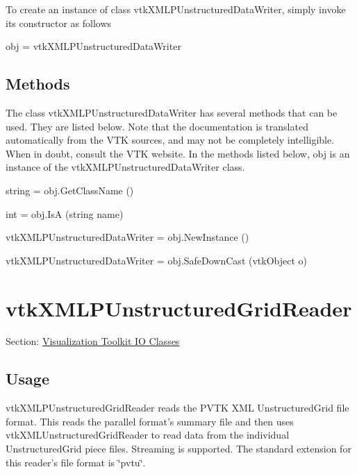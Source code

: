 To create an instance of class vtk\-X\-M\-L\-P\-Unstructured\-Data\-Writer, simply invoke its constructor as follows \begin{DoxyVerb}  obj = vtkXMLPUnstructuredDataWriter
\end{DoxyVerb}
 \hypertarget{vtkwidgets_vtkxyplotwidget_Methods}{}\subsection{Methods}\label{vtkwidgets_vtkxyplotwidget_Methods}
The class vtk\-X\-M\-L\-P\-Unstructured\-Data\-Writer has several methods that can be used. They are listed below. Note that the documentation is translated automatically from the V\-T\-K sources, and may not be completely intelligible. When in doubt, consult the V\-T\-K website. In the methods listed below, {\ttfamily obj} is an instance of the vtk\-X\-M\-L\-P\-Unstructured\-Data\-Writer class. 
\begin{DoxyItemize}
\item {\ttfamily string = obj.\-Get\-Class\-Name ()}  
\item {\ttfamily int = obj.\-Is\-A (string name)}  
\item {\ttfamily vtk\-X\-M\-L\-P\-Unstructured\-Data\-Writer = obj.\-New\-Instance ()}  
\item {\ttfamily vtk\-X\-M\-L\-P\-Unstructured\-Data\-Writer = obj.\-Safe\-Down\-Cast (vtk\-Object o)}  
\end{DoxyItemize}\hypertarget{vtkio_vtkxmlpunstructuredgridreader}{}\section{vtk\-X\-M\-L\-P\-Unstructured\-Grid\-Reader}\label{vtkio_vtkxmlpunstructuredgridreader}
Section\-: \hyperlink{sec_vtkio}{Visualization Toolkit I\-O Classes} \hypertarget{vtkwidgets_vtkxyplotwidget_Usage}{}\subsection{Usage}\label{vtkwidgets_vtkxyplotwidget_Usage}
vtk\-X\-M\-L\-P\-Unstructured\-Grid\-Reader reads the P\-V\-T\-K X\-M\-L Unstructured\-Grid file format. This reads the parallel format's summary file and then uses vtk\-X\-M\-L\-Unstructured\-Grid\-Reader to read data from the individual Unstructured\-Grid piece files. Streaming is supported. The standard extension for this reader's file format is \char`\"{}pvtu\char`\"{}.

